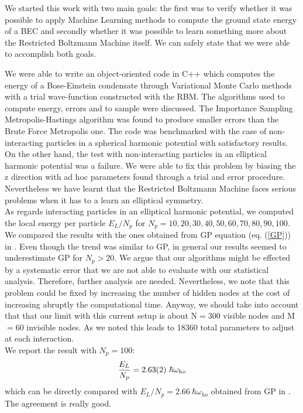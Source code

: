 We started this work with two main goals: the first was to verify whether it was possible to apply Machine Learning methods to compute the ground state energy of a BEC and secondly whether it was possible to learn something more about the Restricted Boltzmann Machine itself. We can safely state that we were able to accomplish both goals. 

We were able to write an object-oriented code in C++ which computes the energy of a Bose-Einstein condensate through Variational Monte Carlo methods with a trial wave-function constructed with the RBM. The algorithms used to compute energy, errors and to sample were discussed. The Importance Sampling Metropolis-Hastings algorithm was found to produce smaller errors than the Brute Force Metropolis one. The code was benchmarked with the case of non-interacting particles in a spherical harmonic potential with satisfactory results. On the other hand, the test with non-interacting particles in an elliptical harmonic potential was a failure. We were able to fix this problem by biasing the z direction with ad hoc parameters found through a trial and error procedure. Nevertheless we have learnt that the Restricted Boltzmann Machine faces serious problems when it has to a learn an elliptical symmetry. \\
As regards interacting particles in an elliptical harmonic potential, we computed the local energy per particle $E_L/N_p$ for $N_p=10,20,30,40,50,60,70,80,90,100$. We compared the results with the ones obtained from GP equation (eq. (\ref{GP})) in \cite{DalfString}. Even though the trend was similar to GP, in general our results seemed to underestimate GP for $N_p>20$. We argue that our algorithms might be effected by a systematic error that we are not able to evaluate with our statistical analysis. Therefore, further analysis are needed. Nevertheless, we note that this problem could be fixed by increasing the number of hidden nodes at the cost of increasing abruptly the computational time. Anyway, we should take into account that that our limit with this current setup is about N$=300$ visible nodes and M$=60$ invisible nodes. As we noted this leads to 18360 total parameters to adjust at each interaction. \\
We report the result with $N_p=100$:
\begin{equation*}
	\frac{E_L}{N_p}=\SI{2.63\pm 0.02}{}\ \hbar\omega_{ho}
\end{equation*} 
which can be directly compared with $E_L/N_p=2.66\  \hbar\omega_{ho}$ obtained from GP in \cite{DalfString}. The agreement is really good.

